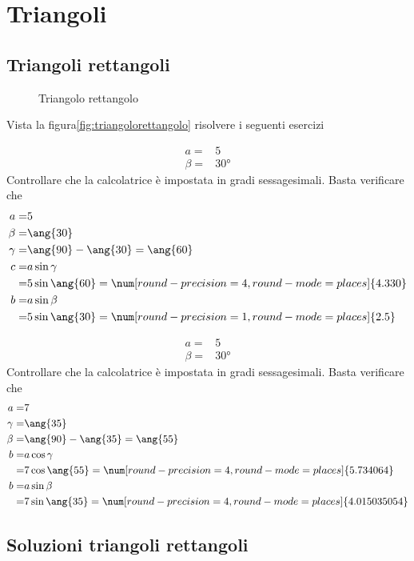 \chapter{Triangoli}
\label{cha:trigonometriatriangoli}
 \section{Triangoli rettangoli}
\begin{figure}
	\centering
	
	\caption{Triangolo rettangolo}
	\label{fig:triangolorettangolo}
\end{figure}
Vista la figura\nobs\vref{fig:triangolorettangolo} risolvere i seguenti esercizi
 \tcbstartrecording
 \begin{exercise}
 	\begin{align*}
 	a=&5\\
 	\beta=&\ang{30}
 	\end{align*}
\tcblower
Controllare che la calcolatrice è impostata in gradi sessagesimali.
Basta verificare che \testgradi 
\begin{align*}
a=&5\\
\beta=&\ang{30}\\
\gamma=&\ang{90}-\ang{30}=\ang{60}\\
c=&a\sin\gamma\\
=& 5\sin\ang{60}=\num[round-precision=\lungarrotandamento,round-mode=places]{4.330}\\
b=&a\sin\beta\\
=& 5\sin\ang{30}=\num[round-precision=1,round-mode=places]{2.5}
\end{align*}
 \end{exercise}
 
  \begin{exercise}
  	\begin{align*}
  	a=&5\\
  	\beta=&\ang{30}
  	\end{align*}
  	\tcblower
  	Controllare che la calcolatrice è impostata in gradi sessagesimali.
  	Basta verificare che \testgradi 
  	\begin{align*}
  	a=& 7\\
  	\gamma=&\ang{35}\\
  	\beta=&\ang{90}-\ang{35}=\ang{55}\\
  	b=&a\cos\gamma\\
  	=& 7\cos\ang{55}=\num[round-precision=\lungarrotandamento,round-mode=places]{5.734064}\\
  	b=&a\sin\beta\\
  	=& 7\sin\ang{35}=\num[round-precision=\lungarrotandamento,round-mode=places]{4.015035054}
  	\end{align*}
  \end{exercise}
\tcbstoprecording
 \newpage
 \section{Soluzioni triangoli rettangoli}
 \tcbinputrecords